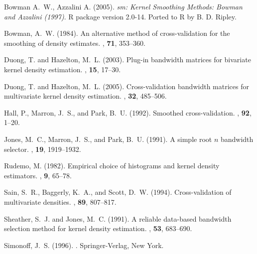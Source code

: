 \documentclass[a4paper,11pt]{article}
\begin{document}
\begin{thebibliography}{xx}

Bowman A.~W., Azzalini A. (2005).
\newblock \emph{sm: Kernel Smoothing Methods: Bowman and Azzalini (1997)}.
\newblock R package version 2.0-14. Ported to R by B. D. Ripley.

Bowman, A.~W. (1984).
\newblock An alternative method of cross-validation for the smoothing of
  density estimates.
, \textbf{71}, 353--360.

Duong, T. and Hazelton, M.~L. (2003).
\newblock Plug-in bandwidth matrices for bivariate kernel density estimation.
, \textbf{15}, 17--30.

Duong, T. and Hazelton, M.~L. (2005).
\newblock Cross-validation bandwidth matrices for multivariate kernel density
  estimation.
, \textbf{32}, 485--506.

Hall, P., Marron, J.~S., and Park, B.~U. (1992).
\newblock Smoothed cross-validation.
, \textbf{92}, 1--20.

Jones, M.~C., Marron, J.~S., and Park, B.~U. (1991).
\newblock A simple root $n$ bandwidth selector.
, \textbf{19}, 1919--1932.

Rudemo, M. (1982).
\newblock Empirical choice of histograms and kernel density estimators.
,
  \textbf{9}, 65--78.

Sain, S.~R., Baggerly, K.~A., and Scott, D.~W. (1994).
\newblock Cross-validation of multivariate densities.
, \textbf{89}, 807--817.

Sheather, S.~J. and Jones, M.~C. (1991).
\newblock A reliable data-based bandwidth selection method for kernel density
  estimation.
, \textbf{53}, 683--690.

Simonoff, J.~S. (1996).
.
\newblock Springer-Verlag, New York.


\end{thebibliography}
\end{document}
